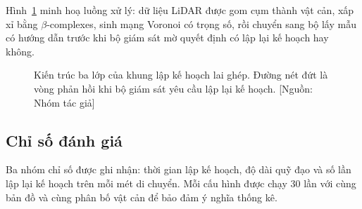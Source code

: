 Hình~\ref{fig:pipeline} minh hoạ luồng xử lý: dữ liệu LiDAR được gom cụm
thành vật cản, xấp xỉ bằng $\beta$-complexes, sinh mạng Voronoi có trọng
số, rồi chuyển sang bộ lấy mẫu có hướng dẫn trước khi bộ giám sát mờ quyết
định có lập lại kế hoạch hay không.

\begin{figure}[!htbp]
  \centering
  \caption{Kiến trúc ba lớp của khung lập kế hoạch lai ghép.
           Đường nét đứt là vòng phản hồi khi bộ giám sát yêu cầu lập lại
           kế hoạch. [Nguồn: Nhóm tác giả]}
  \label{fig:pipeline}
\end{figure}

\subsection{Chỉ số đánh giá}

Ba nhóm chỉ số được ghi nhận: thời gian lập kế hoạch, độ dài quỹ đạo và số
lần lập lại kế hoạch trên mỗi mét di chuyển. Mỗi cấu hình được chạy 30 lần
với cùng bản đồ và cùng phân bố vật cản để bảo đảm ý nghĩa thống kê.
